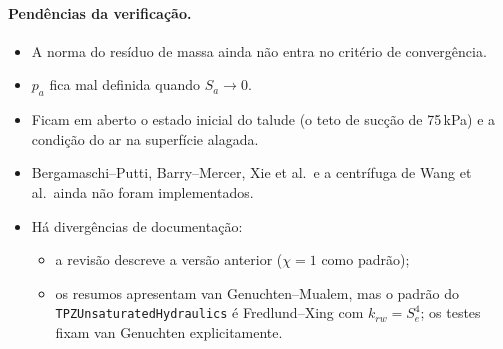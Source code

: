 \paragraph{Pendências da verificação.}
\begin{itemize}
  \item A norma do resíduo de massa ainda não entra no critério de convergência.
  \item $p_a$ fica mal definida quando $S_a \to 0$.
  \item Ficam em aberto o estado inicial do talude (o teto de sucção de 75\,kPa) e a condição do ar na superfície
    alagada.
  \item Bergamaschi--Putti, Barry--Mercer, Xie et al.\ e a centrífuga de Wang et al.\ ainda não foram implementados.
  \item Há divergências de documentação:
    \begin{itemize}
      \item a revisão descreve a versão anterior ($\chi = 1$ como padrão);
      \item os resumos apresentam van Genuchten--Mualem, mas o padrão do \texttt{TPZUnsaturatedHydraulics} é
        Fredlund--Xing com $k_{rw} = S_e^4$; os testes fixam van Genuchten explicitamente.
    \end{itemize}
\end{itemize}
